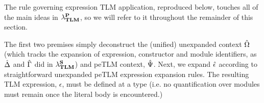 \documentclass[acmsmall,review,anonymous]{acmart}\settopmatter{printfolios=true,printccs=false,printacmref=false}
\begin{document}
The rule governing expression TLM application, reproduced below, touches all of the main ideas in $\miniVerseParam$, so we will refer to it throughout the remainder of this section.%
{\small\begin{mathpar}
\end{mathpar}}

The first two premises simply deconstruct the (unified) unexpanded context $\uOmega$ (which tracks the expansion of expression, constructor and module identifiers, as $\uDelta$ and $\uGamma$ did in $\miniVersePat$) and peTLM context, $\uPsi$. Next, we expand $\uepsilon$ according to straightforward unexpanded peTLM expression expansion rules. The resulting TLM expression, $\epsilon$, must be defined at a type (i.e. no quantification over modules must remain once the literal body is encountered.)
\end{document}
